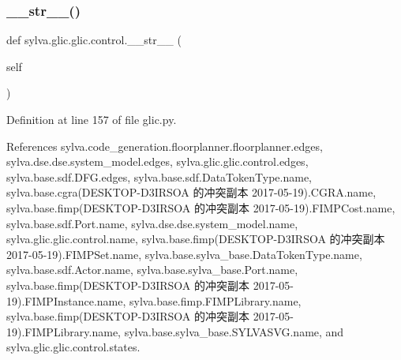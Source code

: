 \subsubsection{\texorpdfstring{\+\_\+\+\_\+str\+\_\+\+\_\+()}{\_\_str\_\_()}}
{\footnotesize\ttfamily def sylva.\+glic.\+glic.\+control.\+\_\+\+\_\+str\+\_\+\+\_\+ (\begin{DoxyParamCaption}\item[{}]{self }\end{DoxyParamCaption})}



Definition at line 157 of file glic.\+py.



References sylva.\+code\+\_\+generation.\+floorplanner.\+floorplanner.\+edges, sylva.\+dse.\+dse.\+system\+\_\+model.\+edges, sylva.\+glic.\+glic.\+control.\+edges, sylva.\+base.\+sdf.\+D\+F\+G.\+edges, sylva.\+base.\+sdf.\+Data\+Token\+Type.\+name, sylva.\+base.\+cgra(\+D\+E\+S\+K\+T\+O\+P-\/\+D3\+I\+R\+S\+O\+A 的冲突副本 2017-\/05-\/19).\+C\+G\+R\+A.\+name, sylva.\+base.\+fimp(\+D\+E\+S\+K\+T\+O\+P-\/\+D3\+I\+R\+S\+O\+A 的冲突副本 2017-\/05-\/19).\+F\+I\+M\+P\+Cost.\+name, sylva.\+base.\+sdf.\+Port.\+name, sylva.\+dse.\+dse.\+system\+\_\+model.\+name, sylva.\+glic.\+glic.\+control.\+name, sylva.\+base.\+fimp(\+D\+E\+S\+K\+T\+O\+P-\/\+D3\+I\+R\+S\+O\+A 的冲突副本 2017-\/05-\/19).\+F\+I\+M\+P\+Set.\+name, sylva.\+base.\+sylva\+\_\+base.\+Data\+Token\+Type.\+name, sylva.\+base.\+sdf.\+Actor.\+name, sylva.\+base.\+sylva\+\_\+base.\+Port.\+name, sylva.\+base.\+fimp(\+D\+E\+S\+K\+T\+O\+P-\/\+D3\+I\+R\+S\+O\+A 的冲突副本 2017-\/05-\/19).\+F\+I\+M\+P\+Instance.\+name, sylva.\+base.\+fimp.\+F\+I\+M\+P\+Library.\+name, sylva.\+base.\+fimp(\+D\+E\+S\+K\+T\+O\+P-\/\+D3\+I\+R\+S\+O\+A 的冲突副本 2017-\/05-\/19).\+F\+I\+M\+P\+Library.\+name, sylva.\+base.\+sylva\+\_\+base.\+S\+Y\+L\+V\+A\+S\+V\+G.\+name, and sylva.\+glic.\+glic.\+control.\+states.


